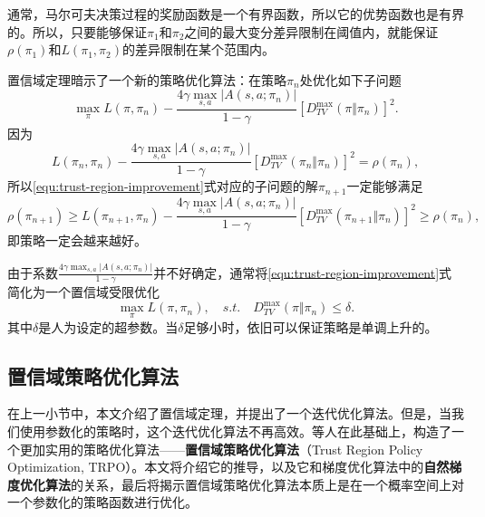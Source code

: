 通常，马尔可夫决策过程的奖励函数是一个有界函数，所以它的优势函数也是有界的。所以，只要能够保证$\pi_1$和$\pi_2$之间的最大变分差异限制在阈值内，就能保证$\rho(\pi_1)$和$L(\pi_1, \pi_2)$的差异限制在某个范围内。

置信域定理暗示了一个新的策略优化算法：在策略$\pi_n$处优化如下子问题
\begin{equation}\label{equ:trust-region-improvement}
    \max_{\pi} L(\pi, \pi_n) - \frac{4 \gamma \max_{s, a} \vert A(s,a; \pi_n) \vert}{1 - \gamma} [D^{\max}_{TV} (\pi \Vert \pi_n)]^2.
\end{equation}
因为
\begin{equation}
    L(\pi_n, \pi_n) - \frac{4 \gamma \max_{s, a} \vert A(s,a; \pi_n) \vert}{1 - \gamma} [D^{\max}_{TV} (\pi_n \Vert \pi_n)]^2 = \rho(\pi_n),
\end{equation}
所以\eqref{equ:trust-region-improvement}式对应的子问题的解$\pi_{n+1}$一定能够满足
\begin{equation}
    \rho(\pi_{n+1}) \ge L(\pi_{n+1}, \pi_n) - \frac{4 \gamma \max_{s, a} \vert A(s,a; \pi_n) \vert}{1 - \gamma} [D^{\max}_{TV} (\pi_{n+1} \Vert \pi_n)]^2
    \ge \rho(\pi_n),
\end{equation}
即策略一定会越来越好。

由于系数$\frac{4 \gamma \max_{s, a} \vert A(s,a; \pi_n) \vert}{1 - \gamma}$并不好确定，通常将\eqref{equ:trust-region-improvement}式简化为一个置信域受限优化
\begin{equation}
    \max_{\pi} L(\pi, \pi_n), \quad s.t.\quad D^{\max}_{TV}(\pi \Vert \pi_n) \le \delta.
\end{equation}
其中$\delta$是人为设定的超参数。当$\delta$足够小时，依旧可以保证策略是单调上升的。

\subsection{置信域策略优化算法}

在上一小节中，本文介绍了置信域定理，并提出了一个迭代优化算法。但是，当我们使用参数化的策略时，这个迭代优化算法不再高效。\cite{schulman2015trust}等人在此基础上，构造了一个更加实用的策略优化算法——\textbf{置信域策略优化算法}\cite{schulman2015trust}（Trust Region Policy Optimization, TRPO）。本文将介绍它的推导，以及它和梯度优化算法中的\textbf{自然梯度优化算法}\cite{amari1998natural}的关系，最后将揭示置信域策略优化算法本质上是在一个概率空间上对一个参数化的策略函数进行优化。

